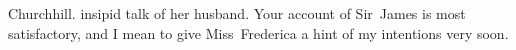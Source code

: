 \begin{mail}{Churchhill.}{}
insipid talk of her husband. Your account of Sir~James is most satisfactory, and I mean to give Miss~Frederica a hint of my intentions very soon. 

\end{mail}